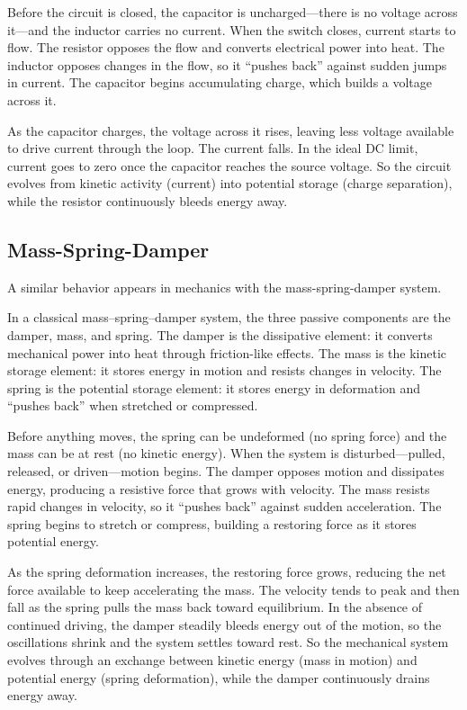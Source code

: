 \documentclass[
  letterpaper,
  DIV=11,
  numbers=noendperiod]{scrartcl}
\begin{document}
Before the circuit is closed, the capacitor is uncharged---there is no
voltage across it---and the inductor carries no current. When the switch
closes, current starts to flow. The resistor opposes the flow and
converts electrical power into heat. The inductor opposes changes in the
flow, so it ``pushes back'' against sudden jumps in current. The
capacitor begins accumulating charge, which builds a voltage across it.

As the capacitor charges, the voltage across it rises, leaving less
voltage available to drive current through the loop. The current falls.
In the ideal DC limit, current goes to zero once the capacitor reaches
the source voltage. So the circuit evolves from kinetic activity
(current) into potential storage (charge separation), while the resistor
continuously bleeds energy away.

\subsection{Mass-Spring-Damper}\label{mass-spring-damper}

A similar behavior appears in mechanics with the mass-spring-damper
system.

In a classical mass--spring--damper system, the three passive components
are the damper, mass, and spring. The damper is the dissipative element:
it converts mechanical power into heat through friction-like effects.
The mass is the kinetic storage element: it stores energy in motion and
resists changes in velocity. The spring is the potential storage
element: it stores energy in deformation and ``pushes back'' when
stretched or compressed.

Before anything moves, the spring can be undeformed (no spring force)
and the mass can be at rest (no kinetic energy). When the system is
disturbed---pulled, released, or driven---motion begins. The damper
opposes motion and dissipates energy, producing a resistive force that
grows with velocity. The mass resists rapid changes in velocity, so it
``pushes back'' against sudden acceleration. The spring begins to
stretch or compress, building a restoring force as it stores potential
energy.

As the spring deformation increases, the restoring force grows, reducing
the net force available to keep accelerating the mass. The velocity
tends to peak and then fall as the spring pulls the mass back toward
equilibrium. In the absence of continued driving, the damper steadily
bleeds energy out of the motion, so the oscillations shrink and the
system settles toward rest. So the mechanical system evolves through an
exchange between kinetic energy (mass in motion) and potential energy
(spring deformation), while the damper continuously drains energy away.
\end{document}
